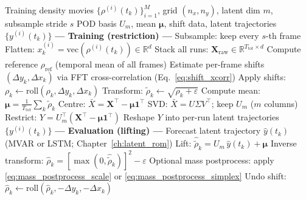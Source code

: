 \begin{algorithm}[H]
\caption{Global POD restriction--lifting pipeline.}
\label{alg:pod_pipeline}
{\footnotesize
\begin{algorithmic}[1]
\Require Training density movies $\{\rho^{(i)}(t_k)\}_{i=1}^M$, grid $(n_x,n_y)$,
  latent dim $m$, subsample stride $s$
\Ensure POD basis $U_m$, mean $\boldsymbol{\mu}$, shift data, latent trajectories
  $\{y^{(i)}(t_k)\}$
\Statex
\Statex \textbf{--- Training (restriction) ---}
  \State Subsample: keep every $s$-th frame
  \State Flatten: $x^{(i)}_k = \mathrm{vec}(\rho^{(i)}(t_k))\in\mathbb{R}^d$
\EndFor
\State Stack all runs: $\mathbf{X}_{\mathrm{raw}}\in\mathbb{R}^{T_{\mathrm{tot}}\times d}$
\State Compute reference $\rho_{\mathrm{ref}}$ (temporal mean of all frames)
\State Estimate per-frame shifts $(\Delta y_k,\Delta x_k)$ via FFT
  cross-correlation (Eq.~\ref{eq:shift_xcorr})
\State Apply shifts: $\rho_k\leftarrow\mathrm{roll}(\rho_k,\Delta y_k,\Delta x_k)$
\State Transform: $\tilde\rho_k\leftarrow\sqrt{\rho_k+\varepsilon}$
\State Compute mean: $\boldsymbol{\mu}=\tfrac{1}{T_{\mathrm{tot}}}\sum_k \tilde\rho_k$
\State Centre: $\bar{X}=\mathbf{X}^\top-\boldsymbol{\mu}\mathbf{1}^\top$
\State SVD: $\bar{X}=U\Sigma V^\top$; keep $U_m$ ($m$ columns)
\State Restrict: $Y=U_m^\top(\mathbf{X}^\top-\boldsymbol{\mu}\mathbf{1}^\top)$
\State Reshape $Y$ into per-run latent trajectories $\{y^{(i)}(t_k)\}$
\Statex
\Statex \textbf{--- Evaluation (lifting) ---}
\State Forecast latent trajectory $\hat{y}(t_k)$ (MVAR or LSTM; Chapter~\ref{ch:latent_rom})
\State Lift: $\hat{\tilde\rho}_k = U_m\,\hat{y}(t_k)+\boldsymbol{\mu}$
\State Inverse transform: $\hat\rho_k = [\max(0,\hat{\tilde\rho}_k)]^2-\varepsilon$
\State Optional mass postprocess: apply \eqref{eq:mass_postprocess_scale}
  or \eqref{eq:mass_postprocess_simplex}
\State Undo shift: $\hat\rho_k\leftarrow\mathrm{roll}(\hat\rho_k,-\Delta y_k,-\Delta x_k)$
\end{algorithmic}
}
\end{algorithm}
